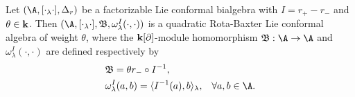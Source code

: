 \documentclass[12pt]{amsart}
\begin{document}
\begin{theorem}\label{flrbl}
Let $(\A,[\cdot_\lambda \cdot],\Delta_r)$ be a factorizable Lie
conformal bialgebra with $I=r_+-r_-$ and $\theta\in {\bf k}$. Then
$(\A,[\cdot_\lambda\cdot],\mathfrak{B},\omega^I_\lambda(\cdot,\cdot))$
is a quadratic    Rota-Baxter Lie conformal
algebra of weight  $\theta$, where the ${\bf k}[\partial]$-module homomorphism
$\mathfrak{B}:\A\rightarrow \A$ and
$\omega^I_\lambda(\cdot,\cdot)$ are defined respectively by
\begin{align}
    \label{b}       &\mathfrak{B}=\theta r_-\circ I^{-1}, \\
    \label{w}       &\omega^I_\lambda(a,b)=\langle I^{-1}(a),b\rangle_\lambda,  \;\;\;\forall  a,b\in \A.
\end{align}

\end{theorem}
\end{document}
